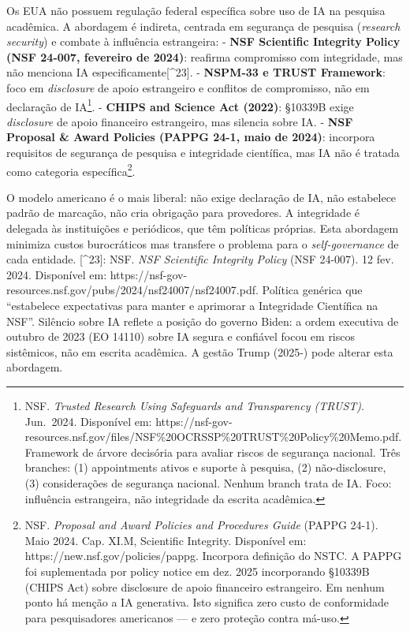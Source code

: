 \documentclass[
  12pt,
  a4paper,
  brazil
]{article}
\begin{document}
Os EUA não possuem regulação federal específica sobre uso de IA na
pesquisa acadêmica. A abordagem é indireta, centrada em segurança de
pesquisa (\emph{research security}) e combate à influência estrangeira:
- \textbf{NSF Scientific Integrity Policy (NSF 24-007, fevereiro de
2024)}: reafirma compromisso com integridade, mas não menciona IA
especificamente{[}\^{}23{]}. - \textbf{NSPM-33 e TRUST Framework}: foco
em \emph{disclosure} de apoio estrangeiro e conflitos de compromisso,
não em declaração de IA\footnote{NSF. \emph{Trusted Research Using
  Safeguards and Transparency (TRUST)}. Jun.~2024. Disponível em:
  https://nsf-gov-resources.nsf.gov/files/NSF\%20OCRSSP\%20TRUST\%20Policy\%20Memo.pdf.
  Framework de árvore decisória para avaliar riscos de segurança
  nacional. Três branches: (1) appointments ativos e suporte à pesquisa,
  (2) não-disclosure, (3) considerações de segurança nacional. Nenhum
  branch trata de IA. Foco: influência estrangeira, não integridade da
  escrita acadêmica.}. - \textbf{CHIPS and Science Act (2022)}: §10339B
exige \emph{disclosure} de apoio financeiro estrangeiro, mas silencia
sobre IA. - \textbf{NSF Proposal \& Award Policies (PAPPG 24-1, maio de
2024)}: incorpora requisitos de segurança de pesquisa e integridade
científica, mas IA não é tratada como categoria específica\footnote{NSF.
  \emph{Proposal and Award Policies and Procedures Guide} (PAPPG 24-1).
  Maio 2024. Cap. XI.M, Scientific Integrity. Disponível em:
  https://new.nsf.gov/policies/pappg. Incorpora definição do NSTC. A
  PAPPG foi suplementada por policy notice em dez. 2025 incorporando
  §10339B (CHIPS Act) sobre disclosure de apoio financeiro estrangeiro.
  Em nenhum ponto há menção a IA generativa. Isto significa zero custo
  de conformidade para pesquisadores americanos --- e zero proteção
  contra má-uso.}.

O modelo americano é o mais liberal: não exige declaração de IA, não
estabelece padrão de marcação, não cria obrigação para provedores. A
integridade é delegada às instituições e periódicos, que têm políticas
próprias. Esta abordagem minimiza custos burocráticos mas transfere o
problema para o \emph{self-governance} de cada entidade. {[}\^{}23{]}:
NSF. \emph{NSF Scientific Integrity Policy} (NSF 24-007). 12 fev. 2024.
Disponível em:
https://nsf-gov-resources.nsf.gov/pubs/2024/nsf24007/nsf24007.pdf.
Política genérica que ``estabelece expectativas para manter e aprimorar
a Integridade Científica na NSF''. Silêncio sobre IA reflete a posição
do governo Biden: a ordem executiva de outubro de 2023 (EO 14110) sobre
IA segura e confiável focou em riscos sistêmicos, não em escrita
acadêmica. A gestão Trump (2025-) pode alterar esta abordagem.
\end{document}

